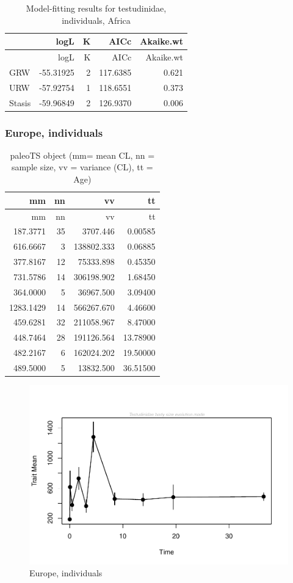 \documentclass[]{article}
\begin{document}
\begin{longtable}[]{@{}lrrrr@{}}
\caption{Model-fitting results for testudinidae, individuals,
Africa}\tabularnewline
\toprule
& logL & K & AICc & Akaike.wt\tabularnewline
\midrule
\endfirsthead
\toprule
& logL & K & AICc & Akaike.wt\tabularnewline
\midrule
\endhead
GRW & -55.31925 & 2 & 117.6385 & 0.621\tabularnewline
URW & -57.92754 & 1 & 118.6551 & 0.373\tabularnewline
Stasis & -59.96849 & 2 & 126.9370 & 0.006\tabularnewline
\bottomrule
\end{longtable}

\newpage

\subsubsection{Europe, individuals}\label{europe-individuals}

\begin{longtable}[]{@{}rrrr@{}}
\caption{paleoTS object (mm= mean CL, nn = sample size, vv = variance
(CL), tt = Age)}\tabularnewline
\toprule
mm & nn & vv & tt\tabularnewline
\midrule
\endfirsthead
\toprule
mm & nn & vv & tt\tabularnewline
\midrule
\endhead
187.3771 & 35 & 3707.446 & 0.00585\tabularnewline
616.6667 & 3 & 138802.333 & 0.06885\tabularnewline
377.8167 & 12 & 75333.898 & 0.45350\tabularnewline
731.5786 & 14 & 306198.902 & 1.68450\tabularnewline
364.0000 & 5 & 36967.500 & 3.09400\tabularnewline
1283.1429 & 14 & 566267.670 & 4.46600\tabularnewline
459.6281 & 32 & 211058.967 & 8.47000\tabularnewline
448.7464 & 28 & 191126.564 & 13.78900\tabularnewline
482.2167 & 6 & 162024.202 & 19.50000\tabularnewline
489.5000 & 5 & 13832.500 & 36.51500\tabularnewline
\bottomrule
\end{longtable}

\begin{figure}[htbp]
\centering
\includegraphics{MA_JJ_files/figure-latex/paleoTS, individuals, Europe-1.pdf}
\caption{Europe, individuals}
\end{figure}
\end{document}
